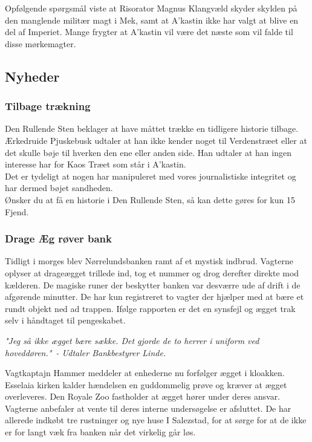 \documentclass[letterpaper,12pt]{memoir}
\newenvironment{pullquote}
  {\begin{tcolorbox}[enhanced, breakable]\itshape\large}
  {\end{tcolorbox}}
\begin{document}
Opfølgende spørgsmål viste at Risorator Magnus Klangvæld skyder skylden på den manglende militær magt i Mek, samt at A'kastin ikke har valgt at blive en del af Imperiet. Mange frygter at A'kastin vil være det næste som vil falde til disse mørkemagter. 

\subsection*{Nyheder}
\subsubsection*{Tilbage trækning}
Den Rullende Sten beklager at have måttet trække en tidligere historie tilbage. Ærkedruide Pjuskebusk udtaler at han ikke kender noget til Verdenstræet eller at det skulle bøje til hverken den ene eller anden side. Han udtaler at han ingen interesse har for Kaos Træet som står i A'kastin.\\
Det er tydeligt at nogen har manipuleret med vores journalistiske integritet og har dermed bøjet sandheden.\\
Ønsker du at få en historie i Den Rullende Sten, så kan dette gøres for kun 15 Fjend.

\subsubsection*{Drage Æg røver bank}
Tidligt i morges blev Nørrelundsbanken ramt af et mystisk indbrud. Vagterne oplyser at drageægget trillede ind, tog et nummer og drog derefter direkte mod kælderen. De magiske runer der beskytter banken var desværre ude af drift i de afgørende minutter. De har kun registreret to vagter der hjælper med at bære et rundt objekt ned ad trappen. Ifølge rapporten er det en synsfejl og ægget trak selv i håndtaget til pengeskabet.

\begin{pullquote}
"Jeg så ikke ægget bære sække. Det gjorde de to herrer i uniform ved hoveddøren."\
\textit{- Udtaler Bankbestyrer Linde.}
\end{pullquote}

Vagtkaptajn Hammer meddeler at enhederne nu forfølger ægget i kloakken. Esselaia kirken kalder hændelsen en guddommelig prøve og kræver at ægget overleveres. Den Royale Zoo fastholder at ægget hører under deres ansvar. Vagterne anbefaler at vente til deres interne undersøgelse er afsluttet. De har allerede indkøbt tre rustninger og nye huse I Salezstad, for at sørge for at de ikke er for langt væk fra banken når det virkelig går løs.
\end{document}
